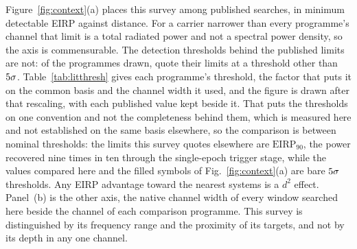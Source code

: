 Figure~\ref{fig:context}(a) places this survey among published searches,
in minimum detectable EIRP against distance. For a carrier narrower than
every programme's channel that limit is a total radiated power and not
a spectral power density, so the axis is commensurable. The detection
thresholds behind the published limits are not: of the \LtNProg{}
programmes drawn, \LtNRescaled{} quote their limits at a threshold other
than $\LtCommonSnr\sigma$. Table~\ref{tab:litthresh} gives each programme's
threshold, the factor that puts it on the common basis and the channel width
it used, and the figure is drawn after that rescaling, with each published
value kept beside it. That
puts the thresholds on one convention and not the completeness behind them,
which is measured here and not established on the same basis elsewhere, so
the comparison is between nominal thresholds: the limits this survey quotes
elsewhere are $\mathrm{EIRP}_{90}$, the power recovered nine times in ten
through the single-epoch trigger stage, while the values compared here and
the filled symbols of Fig.~\ref{fig:context}(a) are bare
$\LtCommonSnr\sigma$ thresholds. Any EIRP advantage toward the nearest
systems is a $d^{2}$ effect.
Panel~(b) is the other axis, the native channel width of every window
searched here beside the channel of each comparison programme. This
survey is distinguished by its frequency range and the proximity of its
targets, and not by its depth in any one channel.

\begin{table}
\centering
\caption{The comparison programmes of Figure~\ref{fig:context}, each on its
own detection threshold and on the common $\LtCommonSnr\sigma$ basis.
$\mathrm{EIRP}_{\rm min}$ is the deepest limit each paper reports, and the
factor is $\LtCommonSnr/(\mathrm{S/N})$, the minimum detectable flux being
linear in the threshold in every one of their own expressions for it.}
\label{tab:litthresh}
\scriptsize
\setlength{\tabcolsep}{4pt}

\end{table}

